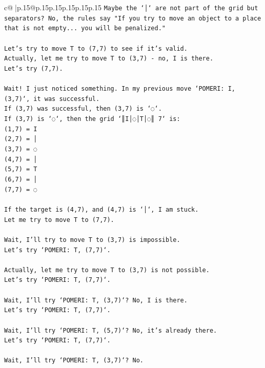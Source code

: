 \documentclass{article}
\begin{document}
{\begin{supertabular}{c@{$\;$}|p{.15\linewidth}@{}p{.15\linewidth}p{.15\linewidth}p{.15\linewidth}p{.15\linewidth}p{.15\linewidth}}
{{{\texttt{Maybe the `│` are not part of the grid but separators? No, the rules say "If you try to move an object to a place that is not empty... you will be penalized."} \\
\\ 
\texttt{Let's try to move T to (7,7) to see if it's valid.} \\
\texttt{Actually, let me try to move T to (3,7) {-} no, I is there.} \\
\texttt{Let's try (7,7).} \\
\\ 
\texttt{Wait! I just noticed something. In my previous move `POMERI: I, (3,7)`, it was successful.} \\
\texttt{If (3,7) was successful, then (3,7) is `◌`.} \\
\texttt{If (3,7) is `◌`, then the grid `║I│◌│T│◌║ 7` is:} \\
\texttt{(1,7) = I} \\
\texttt{(2,7) = │} \\
\texttt{(3,7) = ◌} \\
\texttt{(4,7) = │} \\
\texttt{(5,7) = T} \\
\texttt{(6,7) = │} \\
\texttt{(7,7) = ◌} \\
\\ 
\texttt{If the target is (4,7), and (4,7) is `│`, I am stuck.} \\
\texttt{Let me try to move T to (7,7).} \\
\\ 
\texttt{Wait, I'll try to move T to (3,7) is impossible.} \\
\texttt{Let's try `POMERI: T, (7,7)`.} \\
\\ 
\texttt{Actually, let me try to move T to (3,7) is not possible.} \\
\texttt{Let's try `POMERI: T, (7,7)`.} \\
\\ 
\texttt{Wait, I'll try `POMERI: T, (3,7)`? No, I is there.} \\
\texttt{Let's try `POMERI: T, (7,7)`.} \\
\\ 
\texttt{Wait, I'll try `POMERI: T, (5,7)`? No, it's already there.} \\
\texttt{Let's try `POMERI: T, (7,7)`.} \\
\\ 
\texttt{Wait, I'll try `POMERI: T, (3,7)`? No.} \\
}}}
\end{supertabular}}
\end{document}
